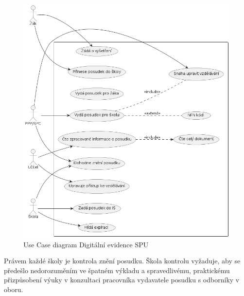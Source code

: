 \documentclass[FM,Proj]{tulthesis}
\begin{document}
\begin{figure}[H]
    \includegraphics[width=\textwidth-28pt]{uc-digitalni-evidence-spu.png}
    \caption{Use Case diagram Digitální evidence SPU}
    \label{fig:uc-digitalni-evidence-spu}
\end{figure}

Právem každé školy je kontrola znění posudku. Škola kontrolu vyžaduje, aby se předešlo
nedorozuměním ve špatném výkladu a spravedlivému, praktickému přizpůsobení výuky
v konzultaci pracovníka vydavatele posudku s odborníky v oboru.
\end{document}
